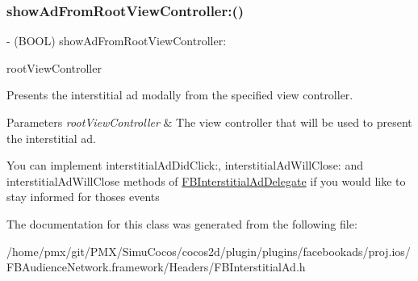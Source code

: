 \subsubsection{\texorpdfstring{show\+Ad\+From\+Root\+View\+Controller\+:()}{showAdFromRootViewController:()}\hspace{0.1cm}{\footnotesize\ttfamily [5/5]}}
{\footnotesize\ttfamily -\/ (B\+O\+OL) show\+Ad\+From\+Root\+View\+Controller\+: \begin{DoxyParamCaption}\item[{(U\+I\+View\+Controller $\ast$)}]{root\+View\+Controller }\end{DoxyParamCaption}}

Presents the interstitial ad modally from the specified view controller.


\begin{DoxyParams}{Parameters}
{\em root\+View\+Controller} & The view controller that will be used to present the interstitial ad.\\
\hline
\end{DoxyParams}
You can implement {\ttfamily interstitial\+Ad\+Did\+Click\+:}, {\ttfamily interstitial\+Ad\+Will\+Close\+:} and {\ttfamily interstitial\+Ad\+Will\+Close} methods of {\ttfamily \hyperlink{classFBInterstitialAdDelegate-p}{F\+B\+Interstitial\+Ad\+Delegate}} if you would like to stay informed for thoses events 

The documentation for this class was generated from the following file\+:\begin{DoxyCompactItemize}
\item 
/home/pmx/git/\+P\+M\+X/\+Simu\+Cocos/cocos2d/plugin/plugins/facebookads/proj.\+ios/\+F\+B\+Audience\+Network.\+framework/\+Headers/F\+B\+Interstitial\+Ad.\+h\end{DoxyCompactItemize}
